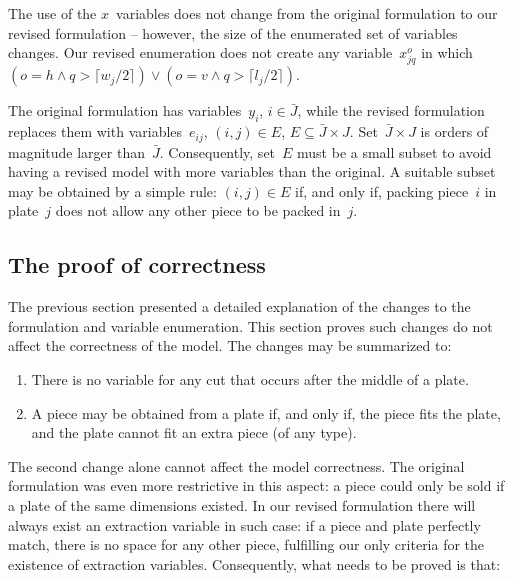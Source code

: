 The use of the \(x\)~variables does not change from the original formulation to our revised formulation -- however, the size of the enumerated set of variables changes.
Our revised enumeration does not create any variable~\(x^o_{jq}\) in which \((o = h \land q > \lceil w_j / 2 \rceil) \lor (o = v \land q > \lceil l_j / 2 \rceil)\).

The original formulation has variables~\(y_i\), \(i \in \bar{J}\), while the revised formulation replaces them with variables~\(e_{ij}\), \((i, j) \in E\), \(E \subseteq \bar{J} \times J\).
Set~\(\bar{J} \times J\) is orders of magnitude larger than~\(\bar{J}\).
Consequently, set~\(E\) must be a small subset to avoid having a revised model with more variables than the original.
A suitable subset may be obtained by a simple rule: \((i, j) \in E\) if, and only if, packing piece~\(i\) in plate~\(j\) does not allow any other piece to be packed in~\(j\).


\subsection{The proof of correctness}

The previous section presented a detailed explanation of the changes to the formulation and variable enumeration.
This section proves such changes do not affect the correctness of the model.
The changes may be summarized to:

\begin{enumerate}
\item There is no variable for any cut that occurs after the middle of a plate.
\item A piece may be obtained from a plate if, and only if, the piece fits the plate, and the plate cannot fit an extra piece (of any type).
\end{enumerate}

The second change alone cannot affect the model correctness.
The original formulation was even more restrictive in this aspect:
a piece could only be sold if a plate of the same dimensions existed.
In our revised formulation there will always exist an extraction variable in such case:
if a piece and plate perfectly match, there is no space for any other piece, fulfilling our only criteria for the existence of extraction variables.
Consequently, what needs to be proved is that:

